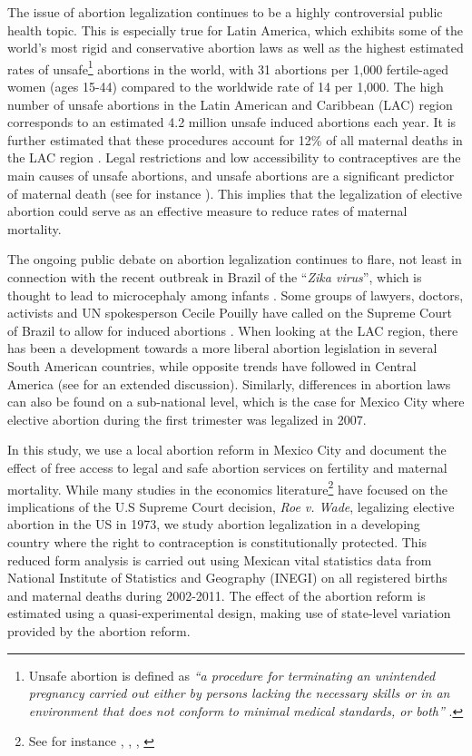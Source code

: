 \documentclass[a4paper, 11pt]{article}
\begin{document}
\begin{spacing}{2}
 	
The issue of abortion legalization continues to be a highly controversial public health topic. This is especially true for Latin America, which exhibits some of the world’s most rigid and conservative abortion laws \citep{UN2014} as well as the highest estimated rates of unsafe\footnote{Unsafe abortion is defined as \textit{``a procedure for terminating an unintended pregnancy carried out either by persons lacking the necessary skills or in an environment that does not conform to minimal medical standards, or both''} \citep{WHO2011}.} abortions in the world, with 31 abortions per 1,000 fertile-aged women (ages 15-44) compared to the worldwide rate of 14 per 1,000. The high number of unsafe abortions in the Latin American and Caribbean (LAC) region corresponds to an estimated 4.2 million unsafe induced abortions each year. It is further estimated that these procedures account for 12\% of all maternal deaths in the LAC region \citep{WHO2011}.  Legal restrictions and low accessibility to contraceptives are the main causes of unsafe abortions, and unsafe abortions are a significant predictor of maternal death (see for instance \cite{Grimes2006}). This implies that the legalization of elective abortion could serve as an effective measure to reduce rates of maternal mortality. 


The ongoing public debate on abortion legalization continues to flare, not least in connection with the recent outbreak in Brazil of the ``\textit{Zika virus}'', which is thought to lead to microcephaly among infants \citep{heymann2016zika}. Some groups of lawyers, doctors, activists and UN spokesperson Cecile Pouilly have called on the Supreme Court of Brazil to allow for induced abortions \citep{guardianFeb}. When looking at the LAC region, there has been a development towards a more liberal abortion legislation in several South American countries, while opposite trends have followed in Central America (see \cite{Fraser} for an extended discussion). Similarly, differences in abortion laws can also be found on a sub-national level, which is the case for Mexico City where elective abortion during the first trimester was legalized in 2007.  

In this study, we use a local abortion reform in Mexico City and document the effect of free access to legal and safe abortion services on fertility and maternal mortality. While many studies in the economics literature\footnote{See for instance \cite{ananat_abortion_2009}, \cite{AngristEvans}, \cite{DonohueLevitt2001}, \cite{CharlesStephens2002}} have focused on the implications of the U.S Supreme Court decision, \textit{Roe v. Wade}, legalizing elective abortion in the US in 1973, we study abortion legalization in a developing country where the right to contraception is constitutionally protected. This reduced form analysis is carried out using Mexican vital statistics data from National Institute of Statistics and Geography (INEGI) on all registered births and maternal deaths during 2002-2011. The effect of the abortion reform is estimated using a quasi-experimental design, making use of state-level variation provided by the abortion reform. 



\end{spacing}
\end{document}
